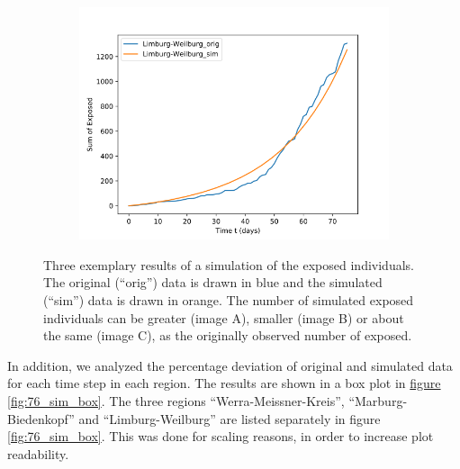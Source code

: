 \begin{figure}[h]
\begin{subfigure}[b]{0.3\textwidth}
		\caption{}
	\end{subfigure}
	\hfill
	\begin{subfigure}[b]{0.3\textwidth}
		\centering
		\includegraphics[width=\textwidth]{./figures/76d/10_Limburg-Weilburg.png}	
		\caption{}
	\end{subfigure}
	\caption{Three exemplary results of a simulation of the exposed individuals.
		The original (``orig'') data is drawn in blue and the simulated (``sim'') data is drawn in orange.
		The number of simulated exposed individuals can be greater (image A), smaller 
		(image B) or about the same (image C), as the originally observed number of exposed.
		}
	\label{fig:76_sim_expl}
\end{figure}

In addition, we analyzed the percentage deviation of original and simulated data for each time step in each region. The results
are shown in a box plot in \hyperref[fig:76_sim_box]{figure \ref*{fig:76_sim_box}}. The three regions ``Werra-Meissner-Kreis'',
``Marburg-Biedenkopf'' and ``Limburg-Weilburg'' are listed separately in figure \ref*{fig:76_sim_box}. This was done for scaling reasons,
in order to increase plot readability.\newline

